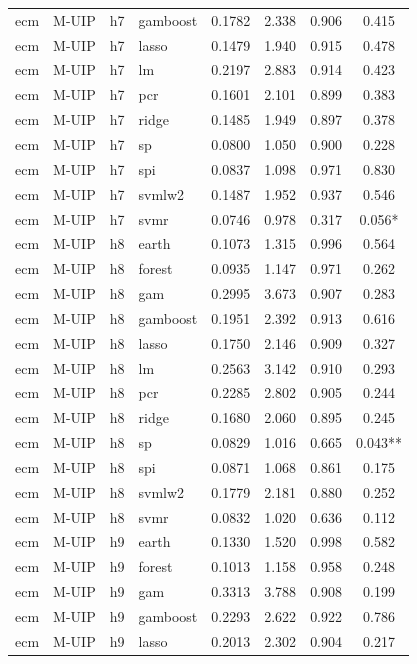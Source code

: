 \begin{ThreePartTable}
\begin{longtable}[t]{llclcccc}
ecm & M-UIP & h7 & gamboost & 0.1782 & 2.338 & 0.906 & 0.415\\
ecm & M-UIP & h7 & lasso & 0.1479 & 1.940 & 0.915 & 0.478\\
ecm & M-UIP & h7 & lm & 0.2197 & 2.883 & 0.914 & 0.423\\
ecm & M-UIP & h7 & pcr & 0.1601 & 2.101 & 0.899 & 0.383\\
ecm & M-UIP & h7 & ridge & 0.1485 & 1.949 & 0.897 & 0.378\\
ecm & M-UIP & h7 & sp & 0.0800 & 1.050 & 0.900 & 0.228\\
ecm & M-UIP & h7 & spi & 0.0837 & 1.098 & 0.971 & 0.830\\
ecm & M-UIP & h7 & svmlw2 & 0.1487 & 1.952 & 0.937 & 0.546\\
ecm & M-UIP & h7 & svmr & 0.0746 & 0.978 & 0.317 & 0.056*\\
\addlinespace
ecm & M-UIP & h8 & earth & 0.1073 & 1.315 & 0.996 & 0.564\\
ecm & M-UIP & h8 & forest & 0.0935 & 1.147 & 0.971 & 0.262\\
ecm & M-UIP & h8 & gam & 0.2995 & 3.673 & 0.907 & 0.283\\
ecm & M-UIP & h8 & gamboost & 0.1951 & 2.392 & 0.913 & 0.616\\
ecm & M-UIP & h8 & lasso & 0.1750 & 2.146 & 0.909 & 0.327\\
ecm & M-UIP & h8 & lm & 0.2563 & 3.142 & 0.910 & 0.293\\
ecm & M-UIP & h8 & pcr & 0.2285 & 2.802 & 0.905 & 0.244\\
ecm & M-UIP & h8 & ridge & 0.1680 & 2.060 & 0.895 & 0.245\\
ecm & M-UIP & h8 & sp & 0.0829 & 1.016 & 0.665 & 0.043**\\
ecm & M-UIP & h8 & spi & 0.0871 & 1.068 & 0.861 & 0.175\\
ecm & M-UIP & h8 & svmlw2 & 0.1779 & 2.181 & 0.880 & 0.252\\
ecm & M-UIP & h8 & svmr & 0.0832 & 1.020 & 0.636 & 0.112\\
\addlinespace
ecm & M-UIP & h9 & earth & 0.1330 & 1.520 & 0.998 & 0.582\\
ecm & M-UIP & h9 & forest & 0.1013 & 1.158 & 0.958 & 0.248\\
ecm & M-UIP & h9 & gam & 0.3313 & 3.788 & 0.908 & 0.199\\
ecm & M-UIP & h9 & gamboost & 0.2293 & 2.622 & 0.922 & 0.786\\
ecm & M-UIP & h9 & lasso & 0.2013 & 2.302 & 0.904 & 0.217\\

\end{longtable}
\end{ThreePartTable}
